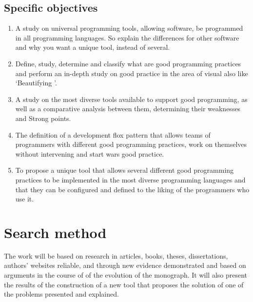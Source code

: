 {\subsection{Specific objectives}

    \begin{enumerate}

        \item

        A study on universal programming tools, allowing
        software, be programmed in all programming languages. So explain the
        differences for other software and why you want a unique tool, instead
        of several.

        \item

        Define, study, determine and classify what are good programming practices and perform
        an in-depth study on good practice in the area of visual
        also like `Beautifying '.

        \item

        A study on the most diverse tools available to support good
        programming, as well as a comparative analysis between them, determining their weaknesses and
        Strong points.

        \item

        The definition of a development flox pattern that allows teams of programmers
        with different good programming practices, work on themselves without intervening and start wars
        good practice.

        \item

        To propose a unique tool that allows several different good programming practices to be
        implemented in the most diverse programming languages and that they can be configured
        and defined to the liking of the programmers who use it.

    \end{enumerate}


\section{Search method}

    The work will be based on research in articles, books, theses, dissertations, authors' websites
    reliable, and through new evidence demonstrated and based on arguments in the course of
    of the evolution of the monograph. It will also present the results of the construction of a
    new tool that proposes the solution of one of the problems presented and explained.

}
